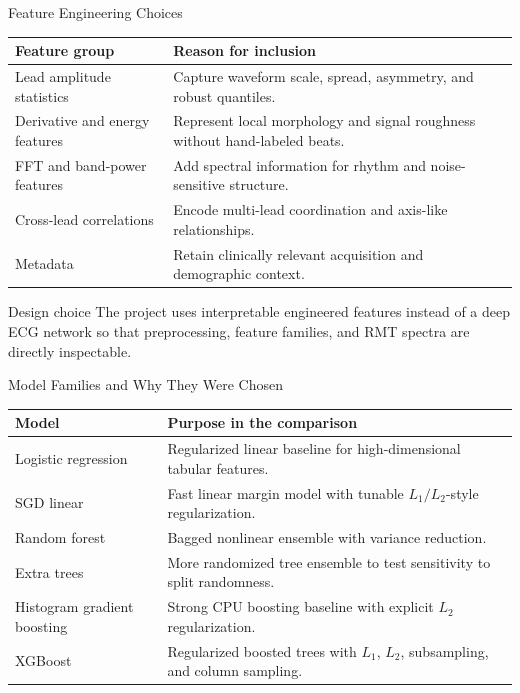 \documentclass[english, xcolor=dvipsnames, aspectratio=169]{beamer}
\begin{document}
\begin{frame}{Feature Engineering Choices}
\begin{center}
\small
\begin{tabular}{lp{8.8cm}}
\toprule
Feature group & Reason for inclusion \\
\midrule
Lead amplitude statistics & Capture waveform scale, spread, asymmetry, and robust quantiles. \\
Derivative and energy features & Represent local morphology and signal roughness without hand-labeled beats. \\
FFT and band-power features & Add spectral information for rhythm and noise-sensitive structure. \\
Cross-lead correlations & Encode multi-lead coordination and axis-like relationships. \\
Metadata & Retain clinically relevant acquisition and demographic context. \\
\bottomrule
\end{tabular}
\end{center}
\begin{block}{Design choice}
The project uses interpretable engineered features instead of a deep ECG network so that preprocessing, feature families, and RMT spectra are directly inspectable.
\end{block}
\end{frame}

\begin{frame}{Model Families and Why They Were Chosen}
\begin{center}
\small
\begin{tabular}{lp{8.5cm}}
\toprule
Model & Purpose in the comparison \\
\midrule
Logistic regression & Regularized linear baseline for high-dimensional tabular features. \\
SGD linear & Fast linear margin model with tunable \(L_1/L_2\)-style regularization. \\
Random forest & Bagged nonlinear ensemble with variance reduction. \\
Extra trees & More randomized tree ensemble to test sensitivity to split randomness. \\
Histogram gradient boosting & Strong CPU boosting baseline with explicit \(L_2\) regularization. \\
XGBoost & Regularized boosted trees with \(L_1\), \(L_2\), subsampling, and column sampling. \\
\bottomrule
\end{tabular}
\end{center}
\end{frame}
\end{document}
